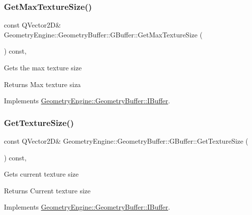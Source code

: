 \subsubsection{\texorpdfstring{GetMaxTextureSize()}{GetMaxTextureSize()}}
{\footnotesize\ttfamily const Q\+Vector2D\& Geometry\+Engine\+::\+Geometry\+Buffer\+::\+G\+Buffer\+::\+Get\+Max\+Texture\+Size (\begin{DoxyParamCaption}{ }\end{DoxyParamCaption}) const\hspace{0.3cm}{\ttfamily [inline]}, {\ttfamily [virtual]}}

Gets the max texture size \begin{DoxyReturn}{Returns}
Max texture siza 
\end{DoxyReturn}


Implements \mbox{\hyperlink{class_geometry_engine_1_1_geometry_buffer_1_1_i_buffer_a0fe7b527d30dc9c5437b8723de2c8746}{Geometry\+Engine\+::\+Geometry\+Buffer\+::\+I\+Buffer}}.

\mbox{\label{class_geometry_engine_1_1_geometry_buffer_1_1_g_buffer_a2b829115597fc587cd6f4ddb52b875cc}} 
\subsubsection{\texorpdfstring{GetTextureSize()}{GetTextureSize()}}
{\footnotesize\ttfamily const Q\+Vector2D\& Geometry\+Engine\+::\+Geometry\+Buffer\+::\+G\+Buffer\+::\+Get\+Texture\+Size (\begin{DoxyParamCaption}{ }\end{DoxyParamCaption}) const\hspace{0.3cm}{\ttfamily [inline]}, {\ttfamily [virtual]}}

Gets current texture size \begin{DoxyReturn}{Returns}
Current texture size 
\end{DoxyReturn}


Implements \mbox{\hyperlink{class_geometry_engine_1_1_geometry_buffer_1_1_i_buffer_af7546a1b668af70daa255747df92181d}{Geometry\+Engine\+::\+Geometry\+Buffer\+::\+I\+Buffer}}.

\mbox{\label{class_geometry_engine_1_1_geometry_buffer_1_1_g_buffer_ad4d5684575aa5819a91097a1b6a0e8df}} 
